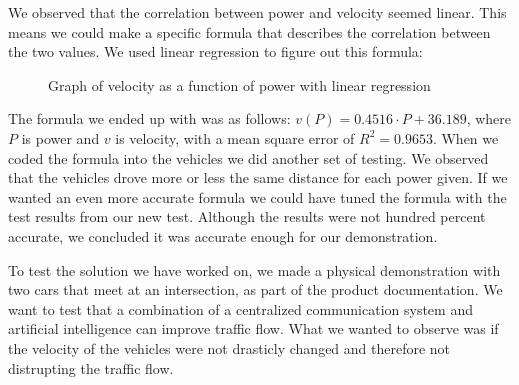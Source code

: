We observed that the correlation between power and velocity seemed linear. This means we could make a specific formula that describes the correlation between the two values. We used linear regression to figure out this formula:

\begin{figure}[h!]
	\caption{Graph of velocity as a function of power with linear regression}
\end{figure}

The formula we ended up with was as follows: $v(P) = 0.4516\cdot P + 36.189$, where $P$ is power and $v$ is velocity, with a mean square error of $R^2=0.9653$. When we coded the formula into the vehicles we did another set of testing. We observed that the vehicles drove more or less the same distance for each power given. If we wanted an even more accurate formula we could have tuned the formula with the test results from our new test. Although the results were not hundred percent accurate, we concluded it was accurate enough for our demonstration. 

To test the solution we have worked on, we made a physical demonstration with two cars that meet at an intersection, as part of the product documentation. We want to test that a combination of a centralized communication system and artificial intelligence can improve traffic flow. What we wanted to observe was if the velocity of the vehicles were not drasticly changed and therefore not distrupting the traffic flow.

